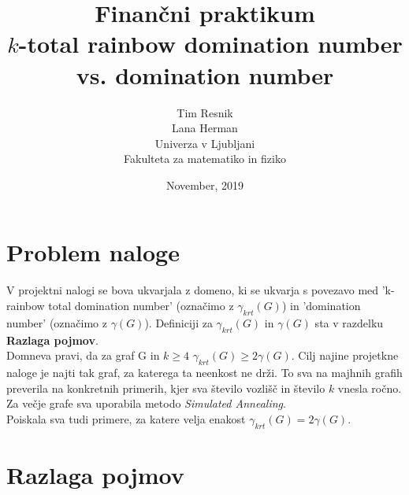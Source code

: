 \documentclass[a4paper]{article}
\title{Finančni praktikum \\\vspace{2cm} {\huge $k$-total rainbow domination number vs. domination number}\vspace{2cm}}
\author{Tim Resnik \\[1.5mm] Lana Herman \\[1.5mm]\vspace{6cm}
Univerza v Ljubljani \\[1.5mm]
Fakulteta za matematiko in fiziko \vspace{2cm}}
\date{November, 2019}
\begin{document}
\begin{titlepage}
\clearpage \maketitle
\thispagestyle{empty}
\end{titlepage}

\tableofcontents
\pagebreak

\section{Problem naloge}

V projektni nalogi se bova ukvarjala z domeno, ki se ukvarja s povezavo med 'k-rainbow total domination number' (označimo z $\gamma_{krt}(G)$)  in 'domination number' (označimo z $\gamma(G)$). Definiciji za $\gamma_{krt}(G)$ in $\gamma(G)$ sta v razdelku \textbf{Razlaga pojmov}.\\
Domneva pravi, da za graf G in $k \geq 4$  $\gamma_{krt}(G) \geq 2\gamma(G)$. Cilj najine projetkne naloge je najti tak graf, za katerega ta neenkost ne drži. To sva na majhnih grafih preverila na konkretnih primerih, kjer sva število vozlišč in število $k$ vnesla ročno. Za večje grafe sva uporabila metodo \textit{Simulated Annealing}.\\
Poiskala sva tudi primere, za katere velja enakost $\gamma_{krt}(G) = 2\gamma(G)$.

\section{Razlaga pojmov}
\end{document}

